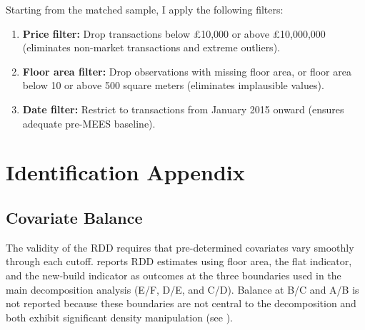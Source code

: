 \documentclass[12pt]{article}
\begin{document}
Starting from the matched sample, I apply the following filters:
\begin{enumerate}
\item \textbf{Price filter:} Drop transactions below \pounds 10,000 or above \pounds 10,000,000 (eliminates non-market transactions and extreme outliers).
\item \textbf{Floor area filter:} Drop observations with missing floor area, or floor area below 10 or above 500 square meters (eliminates implausible values).
\item \textbf{Date filter:} Restrict to transactions from January 2015 onward (ensures adequate pre-MEES baseline).
\end{enumerate}


\section{Identification Appendix}\label{app:identification}

\subsection{Covariate Balance}

The validity of the RDD requires that pre-determined covariates vary smoothly through each cutoff.  reports RDD estimates using floor area, the flat indicator, and the new-build indicator as outcomes at the three boundaries used in the main decomposition analysis (E/F, D/E, and C/D). Balance at B/C and A/B is not reported because these boundaries are not central to the decomposition and both exhibit significant density manipulation (see ).
\end{document}
